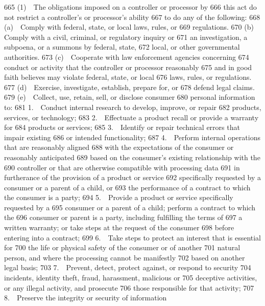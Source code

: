   665         (1) The obligations imposed on a controller or processor by
  666  this act do not restrict a controller’s or processor’s ability
  667  to do any of the following:
  668         (a) Comply with federal, state, or local laws, rules, or
  669  regulations.
  670         (b) Comply with a civil, criminal, or regulatory inquiry or
  671  an investigation, a subpoena, or a summons by federal, state,
  672  local, or other governmental authorities.
  673         (c) Cooperate with law enforcement agencies concerning
  674  conduct or activity that the controller or processor reasonably
  675  and in good faith believes may violate federal, state, or local
  676  laws, rules, or regulations.
  677         (d) Exercise, investigate, establish, prepare for, or
  678  defend legal claims.
  679         (e) Collect, use, retain, sell, or disclose consumer
  680  personal information to:
  681         1. Conduct internal research to develop, improve, or repair
  682  products, services, or technology;
  683         2. Effectuate a product recall or provide a warranty for
  684  products or services;
  685         3. Identify or repair technical errors that impair existing
  686  or intended functionality;
  687         4. Perform internal operations that are reasonably aligned
  688  with the expectations of the consumer or reasonably anticipated
  689  based on the consumer’s existing relationship with the
  690  controller or that are otherwise compatible with processing data
  691  in furtherance of the provision of a product or service
  692  specifically requested by a consumer or a parent of a child, or
  693  the performance of a contract to which the consumer is a party;
  694         5. Provide a product or service specifically requested by a
  695  consumer or a parent of a child; perform a contract to which the
  696  consumer or parent is a party, including fulfilling the terms of
  697  a written warranty; or take steps at the request of the consumer
  698  before entering into a contract;
  699         6. Take steps to protect an interest that is essential for
  700  the life or physical safety of the consumer or of another
  701  natural person, and where the processing cannot be manifestly
  702  based on another legal basis;
  703         7. Prevent, detect, protect against, or respond to security
  704  incidents, identity theft, fraud, harassment, malicious or
  705  deceptive activities, or any illegal activity, and prosecute
  706  those responsible for that activity;
  707         8. Preserve the integrity or security of information
